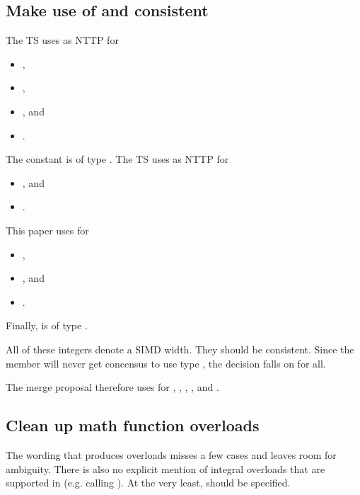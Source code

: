 \subsection{Make use of  and  consistent}

The TS uses  as NTTP for
\begin{itemize}
  \item \stdx\simdabi{},
  \item \stdx{},
  \item \stdx{}, and
  \item \stdx{}.
\end{itemize}
The constant \stdx\simdabi{} is of type .
The TS uses  as NTTP for
\begin{itemize}
  \item {}, and
  \item {}.
\end{itemize}
This paper uses \VSize{}\code{>} for
\begin{itemize}
  \item {},
  \item {}, and
  \item {}.
\end{itemize}
Finally,  is of type .

All of these integers denote a SIMD width.
They should be consistent.
Since the  member will never get concensus to use type ,
the decision falls on  for all.

The merge proposal therefore uses  for
\stdx\simdabi{}, \stdx{},
\stdx{}, \stdx{}, and
\stdx\simdabi{}.

\subsection{Clean up math function overloads}
The wording that produces  overloads misses a few cases and leaves room for ambiguity.
There is also no explicit mention of integral overloads that are supported in  (e.g.  calling ).
At the very least,  should be specified.

